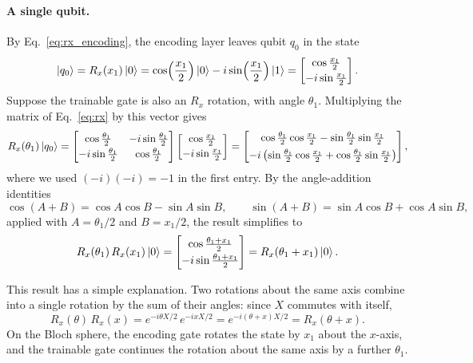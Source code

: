 \documentclass[12pt]{article}
\numberwithin{equation}{section}  %
\begin{document}
\paragraph{A single qubit.} By Eq.~\eqref{eq:rx_encoding}, the encoding layer leaves qubit $q_0$ in the state
\begin{equation}
\ket{q_0} = R_x(x_1)\ket{0} = \cos\!\left(\frac{x_1}{2}\right)\ket{0} - i\sin\!\left(\frac{x_1}{2}\right)\ket{1}
= \begin{bmatrix} \cos\frac{x_1}{2} \\[2pt] -i\sin\frac{x_1}{2} \end{bmatrix}.
\end{equation}
Suppose the trainable gate is also an $R_x$ rotation, with angle $\theta_1$. Multiplying the matrix of Eq.~\eqref{eq:rx} by this vector gives
\begin{equation}
R_x(\theta_1)\ket{q_0}
= \begin{bmatrix} \cos\frac{\theta_1}{2} & -i\sin\frac{\theta_1}{2} \\[2pt] -i\sin\frac{\theta_1}{2} & \cos\frac{\theta_1}{2} \end{bmatrix}
\begin{bmatrix} \cos\frac{x_1}{2} \\[2pt] -i\sin\frac{x_1}{2} \end{bmatrix}
= \begin{bmatrix}
\cos\frac{\theta_1}{2}\cos\frac{x_1}{2} - \sin\frac{\theta_1}{2}\sin\frac{x_1}{2} \\[4pt]
-i\left(\sin\frac{\theta_1}{2}\cos\frac{x_1}{2} + \cos\frac{\theta_1}{2}\sin\frac{x_1}{2}\right)
\end{bmatrix},
\end{equation}
where we used $(-i)(-i) = -1$ in the first entry. By the angle-addition identities
\begin{equation}
\cos(A + B) = \cos A \cos B - \sin A \sin B, \qquad
\sin(A + B) = \sin A \cos B + \cos A \sin B,
\end{equation}
applied with $A = \theta_1/2$ and $B = x_1/2$, the result simplifies to
\begin{equation}
R_x(\theta_1)\, R_x(x_1)\ket{0}
= \begin{bmatrix} \cos\frac{\theta_1 + x_1}{2} \\[2pt] -i\sin\frac{\theta_1 + x_1}{2} \end{bmatrix}
= R_x(\theta_1 + x_1)\ket{0}.
\label{eq:rotation_addition}
\end{equation}

This result has a simple explanation. Two rotations about the same axis combine into a single rotation by the sum of their angles: since $X$ commutes with itself,
\begin{equation}
R_x(\theta)\, R_x(x) = e^{-i\theta X/2}\, e^{-ixX/2} = e^{-i(\theta + x)X/2} = R_x(\theta + x).
\end{equation}
On the Bloch sphere, the encoding gate rotates the state by $x_1$ about the $x$-axis, and the trainable gate continues the rotation about the same axis by a further $\theta_1$.
\end{document}
